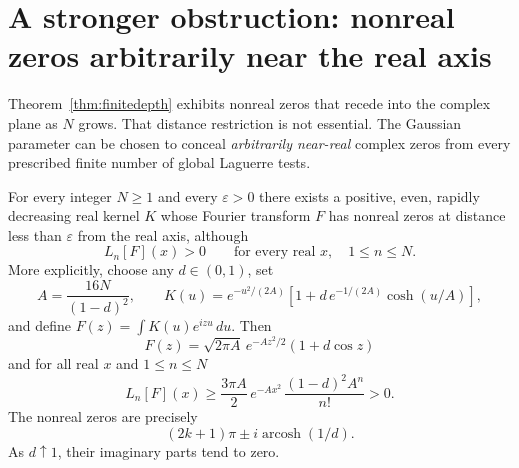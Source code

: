 \section{A stronger obstruction: nonreal zeros arbitrarily near the real axis}
\label{sec:nearreal}
Theorem~\ref{thm:finitedepth} exhibits
nonreal zeros that recede into the complex plane
as $N$ grows. That distance restriction is
not essential. The Gaussian parameter can be
chosen to conceal \emph{arbitrarily near-real}
complex zeros from every prescribed finite
number of global Laguerre tests.

\begin{theorem}
\label{thm:nearreal}
For every integer $N\ge1$ and every
$\varepsilon>0$ there exists a positive,
even, rapidly decreasing real kernel $K$
whose Fourier transform $F$ has nonreal
zeros at distance less than $\varepsilon$
from the real axis, although
\[
L_n[F](x)>0
\qquad\text{for every real }x,\quad
1\le n\le N.
\]
More explicitly, choose any $d\in(0,1)$,
set
\begin{equation}
A=\frac{16N}{(1-d)^2},\qquad
K(u)=e^{-u^2/(2A)}
\left[1+d\,e^{-1/(2A)}\cosh(u/A)\right],
\label{eq:nearK}
\end{equation}
and define $F(z)=\int K(u)e^{izu}\,du$.
Then
\[
F(z)=\sqrt{2\pi A}\,e^{-Az^2/2}
(1+d\cos z)
\]
and for all real $x$ and $1\le n\le N$
\begin{equation}
\boxed{
L_n[F](x)\ge
\frac{3\pi A}{2}
\,e^{-Ax^2}\,
\frac{(1-d)^2A^n}{n!}>0.
}
\label{eq:nearbound}
\end{equation}
The nonreal zeros are precisely
\[
(2k+1)\pi\pm i\operatorname{arcosh}(1/d).
\]
As $d\uparrow1$, their imaginary parts
tend to zero.
\end{theorem}

